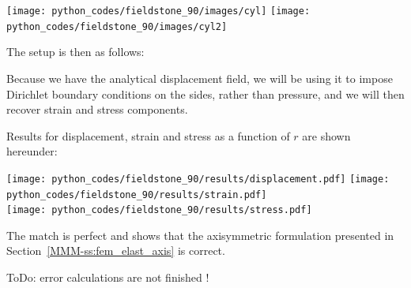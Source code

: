 \begin{center}
\texttt{[image: python\_codes/fieldstone\_90/images/cyl]}
\texttt{[image: python\_codes/fieldstone\_90/images/cyl2]}\\
\end{center}

The setup is then as follows:

\begin{center}
\end{center}

Because we have the analytical displacement field, we will be using it to 
impose Dirichlet boundary conditions on the sides, rather than pressure, and 
we will then recover strain and stress components.

Results for displacement, strain and stress as a function of $r$ are shown hereunder:
\begin{center}
\texttt{[image: python\_codes/fieldstone\_90/results/displacement.pdf]}
\texttt{[image: python\_codes/fieldstone\_90/results/strain.pdf]}\\
\texttt{[image: python\_codes/fieldstone\_90/results/stress.pdf]}
\end{center}
The match is perfect and shows that the axisymmetric formulation presented in 
Section~\ref{MMM-ss:fem_elast_axis} is correct.

ToDo: error calculations are not finished !

